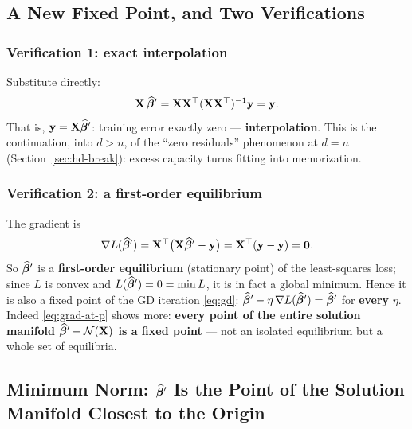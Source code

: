 \subsection{A New Fixed Point, and Two Verifications}

\subsubsection*{Verification 1: exact interpolation}
Substitute directly:
\begin{equation}\label{eq:interp}
  \mathbf{X} \, \widehat{\bm{\beta}}' = \mathbf{X} \mathbf{X}^\top (\mathbf{X} \mathbf{X}^\top)^{-1} \mathbf{y} = \mathbf{y} .
\end{equation}
That is, $\mathbf{y} = \mathbf{X} \widehat{\bm{\beta}}'$: training error exactly zero — \textbf{interpolation}. This is the continuation, into $d > n$, of the ``zero residuals'' phenomenon at $d = n$ (Section~\ref{sec:hd-break}): excess capacity turns fitting into memorization.

\subsubsection*{Verification 2: a first-order equilibrium}
The gradient is
\begin{equation}\label{eq:grad-at-p}
  \nabla L(\widehat{\bm{\beta}}') = \mathbf{X}^\top \big( \mathbf{X} \widehat{\bm{\beta}}' - \mathbf{y} \big) = \mathbf{X}^\top ( \mathbf{y} - \mathbf{y} ) = \mathbf{0} .
\end{equation}
So $\widehat{\bm{\beta}}'$ is a \textbf{first-order equilibrium} (stationary point) of the least-squares loss; since $L$ is convex and $L(\widehat{\bm{\beta}}') = 0 = \min L$, it is in fact a global minimum. Hence it is also a fixed point of the GD iteration \eqref{eq:gd}: $\widehat{\bm{\beta}}' - \eta\, \nabla L(\widehat{\bm{\beta}}') = \widehat{\bm{\beta}}'$ for \textbf{every} $\eta$. Indeed \eqref{eq:grad-at-p} shows more: \textbf{every point of the entire solution manifold $\widehat{\bm{\beta}}' + \mathcal{N}(\mathbf{X})$ is a fixed point} — not an isolated equilibrium but a whole set of equilibria.

\subsection[Minimum Norm: The Point of the Solution Manifold Closest to the Origin]{Minimum Norm: $\widehat{\bm{\beta}}'$ Is the Point of the Solution Manifold Closest to the Origin}\label{sec:minnorm}

